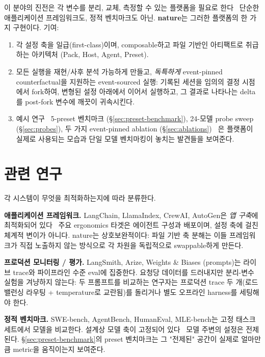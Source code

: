\documentclass[11pt,a4paper]{article}
\begin{document}
이 분야의 진전은 각 변수를 분리, 교체, 측정할 수 있는 플랫폼을
필요로 한다 \textemdash\ 단순한 애플리케이션 프레임워크도, 정적
벤치마크도 아닌. \textbf{nature}는 그러한 플랫폼의 한 가지 구현이다.
기여:

\begin{enumerate}[leftmargin=*,itemsep=2pt,topsep=2pt]
\item 각 설정 축을 일급(first-class)이며, composable하고 파일 기반인
      아티팩트로 취급하는 아키텍처 (Pack, Host, Agent, Preset).
\item 모든 실행을 재현/사후 분석 가능하게 만들고, \emph{독특하게}
      event-pinned counterfactual을 지원하는 event-sourced 실행:
      기록된 세션을 임의의 결정 시점에서 fork하여, 변형된 설정
      아래에서 이어서 실행하고, 그 결과로 나타나는 delta를 post-fork
      변수에 깨끗이 귀속시킨다.
\item 예시 연구 \textemdash\ 5-preset 벤치마크 (\S\ref{sec:preset-benchmark}),
      24-모델 probe sweep (\S\ref{sec:probes}), 두 가지 event-pinned
      ablation (\S\ref{sec:ablations}) \textemdash\ 은 플랫폼이 실제로
      사용되는 모습과 단일 모델 벤치마킹이 놓치는 발견들을 보여준다.
\end{enumerate}

\section{관련 연구}

각 시스템이 무엇을 최적화하는지에 따라 분류한다.

\textbf{애플리케이션 프레임워크.} LangChain, LlamaIndex, CrewAI,
AutoGen은 \emph{앱 구축}에 최적화되어 있다 \textemdash\ 주요 ergonomics
타겟은 에이전트 구성과 배포이며, 설정 축에 걸친 체계적 변이가
아니다. nature는 상호보완적이다: 파일 기반 축 분해는 이들 프레임워크가
직접 노출하지 않는 방식으로 각 차원을 독립적으로 swappable하게 만든다.

\textbf{프로덕션 모니터링 / 평가.} LangSmith, Arize, Weights \& Biases
(prompts)는 라이브 trace와 파이프라인 수준 eval에 집중한다. 요청당
데이터를 드러내지만 분리-변수 실험을 겨냥하지 않는다: 두 프롬프트를
비교하는 연구자는 프로덕션 trace 두 개(로드 밸런싱 라우팅 +
temperature로 교란됨)를 돌리거나 별도 오프라인 harness를 세팅해야 한다.

\textbf{정적 벤치마크.} SWE-bench, AgentBench, HumanEval, MLE-bench는
고정 태스크 세트에서 모델을 비교한다. 설계상 모델 축이 고정되어 있다
\textemdash\ 모델 주변의 설정은 전제된다. \S\ref{sec:preset-benchmark}의
preset 벤치마크는 그 "전제된" 공간이 실제로 얼마만큼 metric을 움직이는지
보여준다.
\end{document}
